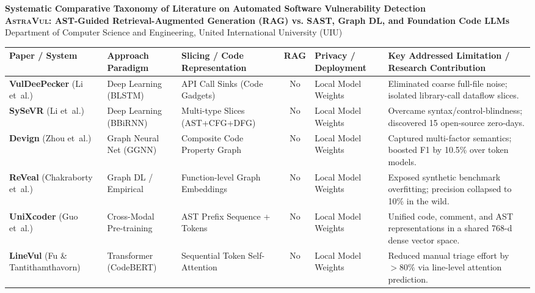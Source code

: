 \documentclass[10pt]{article}
\begin{document}
\begin{center}
    {\Large\textbf{Systematic Comparative Taxonomy of Literature on Automated Software Vulnerability Detection}}\\[2pt]
    {\normalsize\textbf{\textsc{AstraVul}: AST-Guided Retrieval-Augmented Generation (RAG) vs. SAST, Graph DL, and Foundation Code LLMs}}\\[1pt]
    {\small Department of Computer Science and Engineering, United International University (UIU)}
\end{center}

\vspace{3pt}

\noindent
\setlength{\tabcolsep}{3.5pt}
\renewcommand{\arraystretch}{1.08}
\begin{tabular}{|p{3.2cm}|p{3.2cm}|p{4.6cm}|c|p{3.2cm}|p{8.8cm}|}
\hline
\textbf{Paper / System} & \textbf{Approach Paradigm} & \textbf{Slicing / Code Representation} & \textbf{RAG} & \textbf{Privacy / Deployment} & \textbf{Key Addressed Limitation / Research Contribution} \\
\hline
\textbf{VulDeePecker} (Li et~al.) & Deep Learning (BLSTM) & API Call Sinks (Code Gadgets) & No & Local Model Weights & Eliminated coarse full-file noise; isolated library-call dataflow slices. \\
\hline
\textbf{SySeVR} (Li et~al.) & Deep Learning (BBiRNN) & Multi-type Slices (AST+CFG+DFG) & No & Local Model Weights & Overcame syntax/control-blindness; discovered 15 open-source zero-days. \\
\hline
\textbf{Devign} (Zhou et~al.) & Graph Neural Net (GGNN) & Composite Code Property Graph & No & Local Model Weights & Captured multi-factor semantics; boosted F1 by 10.5\% over token models. \\
\hline
\textbf{ReVeal} (Chakraborty et~al.) & Graph DL / Empirical & Function-level Graph Embeddings & No & Local Model Weights & Exposed synthetic benchmark overfitting; precision collapsed to 10\% in the wild. \\
\hline
\textbf{UniXcoder} (Guo et~al.) & Cross-Modal Pre-training & AST Prefix Sequence + Tokens & No & Local Model Weights & Unified code, comment, and AST representations in a shared 768-d dense vector space. \\
\hline
\textbf{LineVul} (Fu \& Tantithamthavorn) & Transformer (CodeBERT) & Sequential Token Self-Attention & No & Local Model Weights & Reduced manual triage effort by $>80\%$ via line-level attention prediction. \\

\end{tabular}
\end{document}
